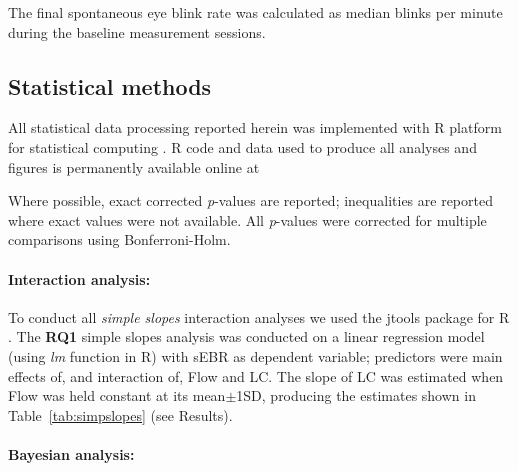 The final spontaneous eye blink rate was calculated as median blinks per minute during the baseline measurement sessions.

\subsection*{Statistical methods}
All statistical data processing reported herein was implemented with {\sf R} platform for statistical computing \cite{R2014}. {\sf R} code and data used to produce all analyses and figures is permanently available online at %

Where possible, exact corrected {\it p}-values are reported; inequalities are reported where exact values were not available.
All {\it p}-values were corrected for multiple comparisons using Bonferroni-Holm.


\paragraph{Interaction analysis:}
To conduct all {\it simple slopes} interaction analyses we used the {\sf jtools} package for {\sf R} \cite{jtools}. The {\bf RQ1} simple slopes analysis was conducted on a linear regression model (using {\it lm} function in {\sf R}) with sEBR as dependent variable; predictors were main effects of, and interaction of, Flow and LC. The slope of LC was estimated when Flow was held constant at its mean$\pm$1SD, producing the estimates shown in Table~\ref{tab:simpslopes} (see Results).

\paragraph{Bayesian analysis:}

